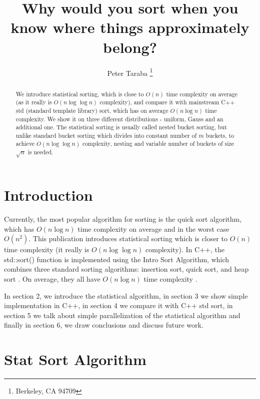 \documentclass[12pt]{article}
\title{Why would you sort when you know where things approximately belong?}
\author{Peter Taraba \footnote{Berkeley, CA 94709}}
\begin{document}
	
	\maketitle
	
	\begin{abstract}
  		We introduce statistical sorting, which is close to $O(n)$ time complexity on average (as it really is $O(n \log \log n)$ complexity), and compare it with mainstream C++ std (standard template library) sort, which has on average $O(n \log n)$ time complexity. We show it on three different distributions - uniform, Gauss and an additional one. The statistical sorting is usually called nested bucket sorting, but unlike standard bucket sorting which divides into constant number of $m$ buckets, to achieve $O(n \log \log n)$ complexity, nesting and variable number of buckets of size $\sqrt{n}$ is needed.
	\end{abstract}
	
	\section{Introduction}
	
		Currently, the most popular algorithm for sorting is the quick sort algorithm, which has $O(n \log n)$ time complexity on average \cite{numrec} and in the worst case $O(n^2)$. This publication introduces statistical sorting which is closer to $O(n)$ time complexity (it really is $O(n \log \log n)$ complexity). In C++, the std::sort() function is implemented using the Intro Sort Algorithm, which combines three standard sorting algorithms: insertion sort, quick sort, and heap sort \cite{cppsort}. On average, they all have $O(n \log n)$ time complexity \cite{wikisort}.
		
		In section 2, we introduce the statistical algorithm, in section 3 we show simple implementation in C++, in section 4 we compare it with C++ std sort, in section 5 we talk about simple parallelization of the statistical algorithm and finally in section 6, we draw conclusions and discuss future work.

	\section{Stat Sort Algorithm}
	
\end{document}
